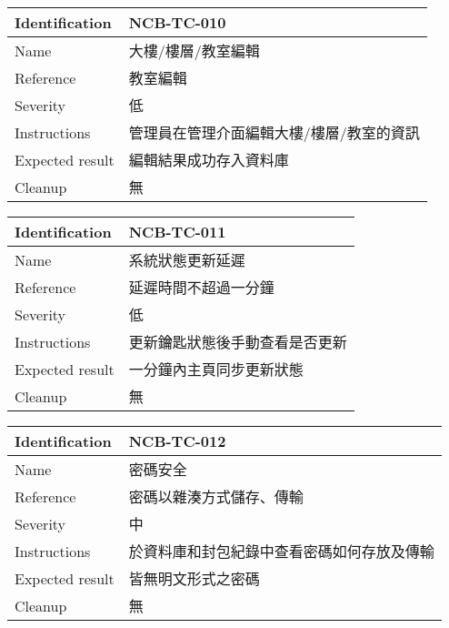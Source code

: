 \documentclass{article}
\begin{document}
\bigskip

\begin{tabularx}{\textwidth}{| A{0.3\textwidth} | X |}
	\hline
	Identification  & NCB-TC-010            \\ \hline
	Name            & 大樓/樓層/教室編輯            \\ \hline
	Reference       & 教室編輯                  \\ \hline
	Severity        & 低                     \\ \hline
	Instructions    & 管理員在管理介面編輯大樓/樓層/教室的資訊 \\ \hline
	Expected result & 編輯結果成功存入資料庫           \\ \hline
	Cleanup         & 無                     \\ \hline
\end{tabularx}

\bigskip

\begin{tabularx}{\textwidth}{| A{0.3\textwidth} | X |}
	\hline
	Identification  & NCB-TC-011      \\ \hline
	Name            & 系統狀態更新延遲        \\ \hline
	Reference       & 延遲時間不超過一分鐘      \\ \hline
	Severity        & 低               \\ \hline
	Instructions    & 更新鑰匙狀態後手動查看是否更新 \\ \hline
	Expected result & 一分鐘內主頁同步更新狀態    \\ \hline
	Cleanup         & 無               \\ \hline
\end{tabularx}

\bigskip

\begin{tabularx}{\textwidth}{| A{0.3\textwidth} | X |}
	\hline
	Identification  & NCB-TC-012            \\ \hline
	Name            & 密碼安全                  \\ \hline
	Reference       & 密碼以雜湊方式儲存、傳輸          \\ \hline
	Severity        & 中                     \\ \hline
	Instructions    & 於資料庫和封包紀錄中查看密碼如何存放及傳輸 \\ \hline
	Expected result & 皆無明文形式之密碼             \\ \hline
	Cleanup         & 無                     \\ \hline
\end{tabularx}
\end{document}

